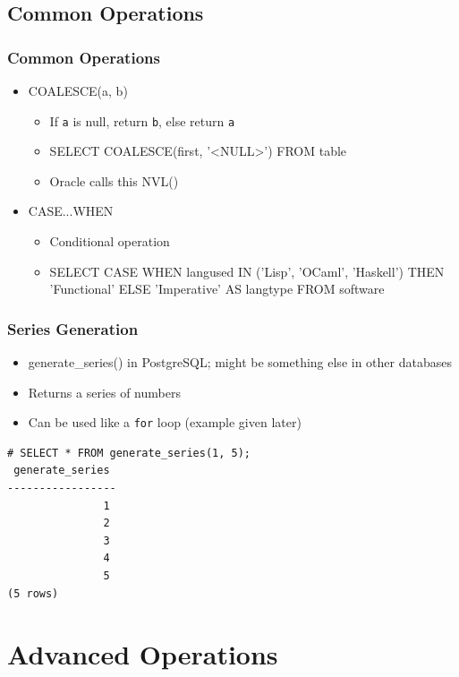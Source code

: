 \documentclass{beamer}
\begin{document}
\subsection{Common Operations}
\begin{frame}
    \frametitle{Common Operations}
    \begin{itemize}
        \item COALESCE(a, b)
        \begin{itemize}
            \item If \texttt{a} is null, return \texttt{b}, else return \texttt{a}
            \item SELECT COALESCE(first, '\textless NULL\textgreater ') FROM table
            \item Oracle calls this NVL()
        \end{itemize}
        \item CASE...WHEN
        \begin{itemize}
            \item Conditional operation
            \item SELECT CASE WHEN langused IN ('Lisp', 'OCaml', 'Haskell') THEN 'Functional' ELSE 'Imperative' AS langtype FROM software
        \end{itemize}
    \end{itemize}
\end{frame}

\begin{frame}[fragile]
    \frametitle{Series Generation}
    \begin{itemize}
        \item generate\_series() in PostgreSQL; might be something else in other databases
        \item Returns a series of numbers
        \item Can be used like a \texttt{for} loop (example given later)
    \end{itemize}
    \begin{verbatim}
# SELECT * FROM generate_series(1, 5);
 generate_series
-----------------
               1
               2
               3
               4
               5
(5 rows)
    \end{verbatim}
\end{frame}

\section{Advanced Operations}
\end{document}
